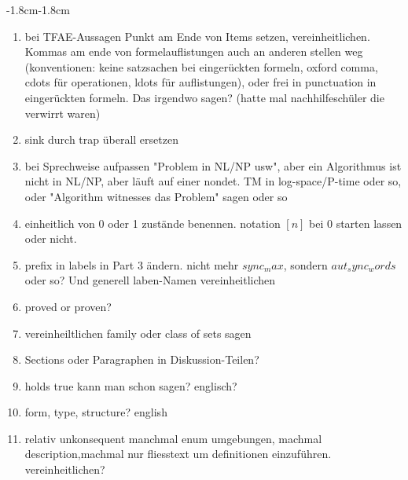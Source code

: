 \begin{adjustwidth}{-1.8cm}{-1.8cm}
\begin{enumerate}[itemsep=-5pt]
		\item bei TFAE-Aussagen Punkt am Ende von Items setzen, vereinheitlichen.  Kommas am ende von formelauflistungen auch an anderen stellen weg (konventionen: keine satzsachen bei eingerückten formeln, oxford comma, cdots für operationen, ldots für auflistungen), oder frei in punctuation in eingerückten formeln. Das irgendwo sagen? (hatte mal nachhilfeschüler die verwirrt waren)
		
		\item sink durch trap überall ersetzen	
		
		\item bei Sprechweise aufpassen "Problem in NL/NP usw", aber ein Algorithmus ist nicht in NL/NP, aber läuft auf einer nondet. TM in log-space/P-time oder so, oder "Algorithm witnesses das Problem" sagen oder so
		
		\item einheitlich von 0 oder 1 zustände benennen. notation $[n]$ bei 0 starten lassen oder nicht.
		
		\item prefix in labels in Part 3 ändern. nicht mehr $sync_max$, sondern $aut_sync_words$ oder so? Und generell
		laben-Namen vereinheitlichen
		
		\item proved or proven?
		
		\item vereinheiltlichen family oder class of sets sagen 	
		
		\item Sections oder Paragraphen in Diskussion-Teilen?
		
		\item holds true kann man schon sagen? englisch?
		
		\item form, type, structure? english
		
		\item relativ unkonsequent manchmal enum umgebungen, machmal description,machmal nur fliesstext um definitionen einzuführen. vereinheitlichen?
		

\end{enumerate}
\end{adjustwidth}
